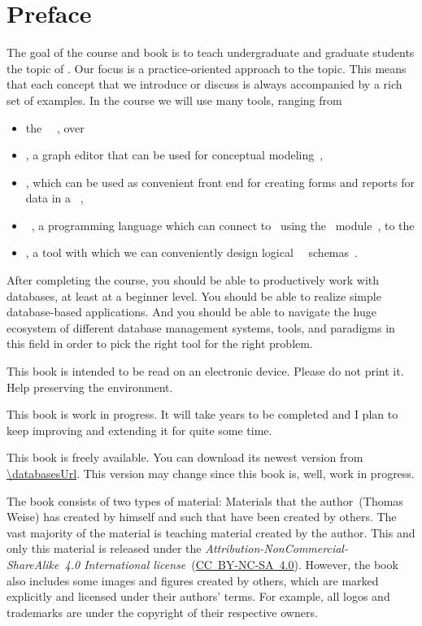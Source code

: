 \chapter*{Preface}%
%
%
The goal of the course and book is to teach undergraduate and graduate students the topic of .
Our focus is a practice-oriented approach to the topic.
This means that each concept that we introduce or discuss is always accompanied by a rich set of examples.
In the course we will use many tools, ranging from%
%
\begin{itemize}%
\item the \postgresql\ ~\cite{TA2024DDAMWPAM,FP2023LP,OH2017PUAR,B2024PELUYDW}, over%
\item \yEd, a graph editor that can be used for conceptual modeling~\cite{SG2015MDAWY,Y2011YGEM},%
\item \libreofficeBase, which can be used as convenient front end for creating forms and reports for data in a ~\cite{FNFHWSKLSSGLFRSRPLJG2022BG7R1BOL7C,S2022L7PFEUU},%
\item \python~\cite{programmingWithPython}, a programming language which can connect to \postgresql\ using the \psycopg\ module~\cite{VDGE2010P}, to the%
\item \pgmodeler, a tool with which we can conveniently design logical \postgresql\ \db\ schemas~\cite{AES2006PPDM}.%
\end{itemize}%
%
After completing the course, you should be able to productively work with databases, at least at a beginner level.
You should be able to realize simple database-based applications.
And you should be able to navigate the huge ecosystem of different database management systems, tools, and paradigms in this field in order to pick the right tool for the right problem.

This book is intended to be read on an electronic device.
Please do not print it.
Help preserving the environment.

This book is work in progress.
It will take years to be completed and I plan to keep improving and extending it for quite some time.

This book is freely available.
You can download its newest version from \expandafter\url{\databasesUrl}.
This version may change since this book is, well, work in progress.

The book consists of two types of material:
Materials that the author~(Thomas Weise) has created by himself and such that have been created by others.
The vast majority of the material is teaching material created by the author.
This and only this material is released under the \emph{Attribution-NonCommercial-ShareAlike~4.0 International license}~(\href{http://creativecommons.org/licenses/by-nc-sa/4.0}{\mbox{CC~BY-NC-SA~4.0}}).
However, the book also includes some images and figures created by others, which are marked explicitly and licensed under their authors' terms.
For example, all logos and trademarks are under the copyright of their respective owners.

